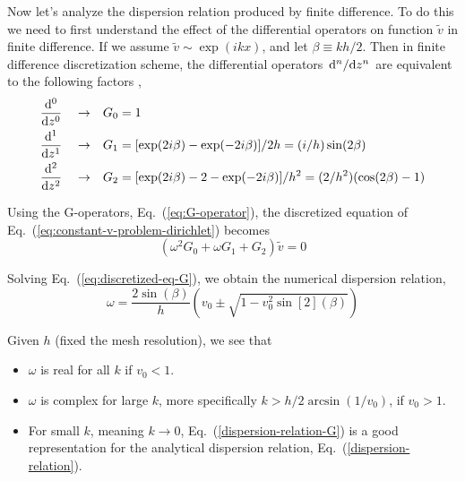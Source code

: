 Now let's analyze the dispersion relation produced by finite difference. To do this we need to first understand the effect of the differential operators on function $\tilde{v}$ in finite difference. If we assume $\tilde{v}\sim \exp(ikx)$, and let $\beta\equiv kh/2$. Then in finite difference discretization scheme, the differential operators $\dv*[n]{z}$ are equivalent to the following factors \cite{llobet_spectral_1990},
\begin{equation}
	\begin{aligned}
		\dv[0]{z} \quad \to \quad & G_0 = 1                                                              \\
		\dv[1]{z} \quad \to \quad & G_1 = [\exp(2i\beta)-\exp(-2i\beta)]/2h = (i/h)\sin(2\beta)          \\
		\dv[2]{z} \quad \to \quad & G_2 = [\exp(2i\beta)-2-\exp(-2i\beta)]/h^2 = (2/h^2)(\cos(2\beta)-1)
	\end{aligned}
	\label{eq:G-operator}
\end{equation}

Using the G-operators, Eq.~(\ref{eq:G-operator}), the discretized equation of Eq.~(\ref{eq:constant-v-problem-dirichlet}) becomes
\begin{equation} \label{eq:discretized-eq-G}
	(\omega^2G_0 + \omega G_1 + G_2)\tilde{v} = 0
\end{equation}

Solving Eq.~(\ref{eq:discretized-eq-G}), we obtain the numerical dispersion relation,
\begin{equation} \label{dispersion-relation-G}
	\omega = \frac{2\sin(\beta)}{h}\left(v_0 \pm \sqrt{1 - v_0^2\sin[2](\beta)}\right)
\end{equation}

Given $h$ (fixed the mesh resolution), we see that
\begin{itemize}
	\item $\omega$ is real for all $k$ if $v_0 < 1$.
	\item $\omega$ is complex for large $k$, more specifically $k>h/2\arcsin(1/v_0)$, if $v_0 > 1$.
	\item For small $k$, meaning $k\to 0$, Eq.~(\ref{dispersion-relation-G}) is a good representation for the analytical dispersion relation, Eq.~(\ref{dispersion-relation}).
\end{itemize}

